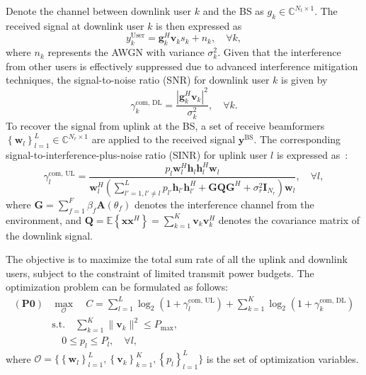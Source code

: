 \documentclass[comsoc,journal]{IEEEtran}
\begin{document}
Denote the channel between downlink user $k$ and the BS as $g_k \in \mathbb{C}^{N_t \times 1}$. The received signal at downlink user $k$ is then expressed as
\begin{equation}
    y_k^{\text{User}} = {\mathbf{g}_k^H \mathbf{v}_k s_k} + n_k, \quad \forall k,
\end{equation}
where $n_k$ represents the AWGN with variance $\sigma_k^2$. Given that the interference from other users is effectively suppressed due to advanced interference mitigation techniques, the signal-to-noise ratio (SNR) for downlink user $k$ is given by 
\begin{equation}
    \gamma_k^{\text{com, DL}} = \frac{|\mathbf{g}_k^H \mathbf{v}_k|^2}{\sigma_k^2}, \quad \forall k.
\end{equation}
To recover the signal from uplink at the BS, a set of receive beamformers $\left\{ \mathbf{w}_l \right\}_{l=1}^{L} \in \mathbb{C}^{N_r \times 1}$ are applied to the received signal $\mathbf{y}^{\text{BS}}$. The corresponding signal-to-interference-plus-noise ratio (SINR) for uplink user $l$ is expressed as~\cite{he2023full}:
\begin{equation}
    \gamma_l^{\text{com, UL}} = \frac{p_l \mathbf{w}_l^H \mathbf{h}_l \mathbf{h}_l^H \mathbf{w}_l}
{\mathbf{w}_l^H \left( \sum_{l' = 1, l' \neq l}^{L} p_{l'} \mathbf{h}_{l'} \mathbf{h}_{l'}^H + \mathbf{GQG}^H + \sigma_r^2 \mathbf{I}_{N_r} \right) \mathbf{w}_l}, \quad \forall l,
\end{equation}
where $\mathbf{G} = \sum_{f=1}^F\beta_f \mathbf{A}(\theta_f)$ denotes the interference channel from the environment, and $\mathbf{Q} = \mathbb{E} \left\{ \mathbf{x} \mathbf{x}^H \right\} = \sum_{k=1}^{K} \mathbf{v}_k \mathbf{v}_k^H$ denotes the covariance matrix of the downlink signal.

The objective is to maximize the total sum rate of all the uplink and downlink users, subject to the constraint of limited transmit power budgets. The optimization problem can be formulated as follows:
\begin{subequations}\label{eq: max-sum-rate} 
\begin{align}
    (\textbf{P0}) &\max_{\mathcal{O}} \quad C = \sum_{l=1}^{L} \log_2 \left( 1 + \gamma_l^{\text{com, UL}} \right) + \sum_{k=1}^{K} \log_2 \left( 1 + \gamma_k^{\text{com, DL}}\right) \\
    \quad & \text{s.t.} \quad \sum_{k=1}^{K} \|\mathbf{v}_k\|^2 \leq P_{\text{max}}, \\
    & \quad 0 \leq p_l \leq P_l, \quad \forall l,
\end{align}
\end{subequations}
where $\mathcal{O}=\{\left\{\mathbf{w}_l \right\}_{l=1}^{L}, \left\{ \mathbf{v}_k \right\}_{k=1}^{K}, \left\{p_l \right\}_{l=1}^{L}\}$ is the set of
optimization variables. 
\vspace{-8pt}
\end{document}
